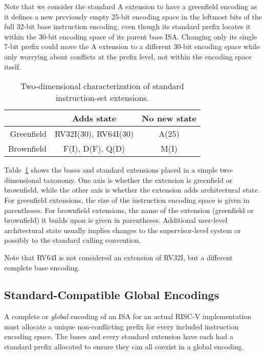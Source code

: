 Note that we consider the standard A extension to have a greenfield
encoding as it defines a new previously empty 25-bit encoding space in
the leftmost bits of the full 32-bit base instruction encoding, even
though its standard prefix locates it within the 30-bit encoding space
of its parent base ISA.
Changing only its single 7-bit prefix could move the
A extension to a different 30-bit encoding space while only worrying
about conflicts at the prefix level, not within the encoding space
itself.

\begin{table}[H]
{
\begin{center}
\begin{tabular}{|r|c|c|}
\hline
 & Adds state & No new state \\ \hline
Greenfield & RV32I(30), RV64I(30) & A(25) \\\hline
Brownfield & F(I), D(F), Q(D) & M(I) \\
\hline
\end{tabular}
\end{center}
}
\caption{Two-dimensional characterization of standard instruction-set
  extensions.}
\label{exttax}
\end{table}

Table~\ref{exttax} shows the bases and standard extensions placed in a
simple two-dimensional taxonomy.  One axis is whether the extension is
greenfield or brownfield, while the other axis is whether the
extension adds architectural state.  For greenfield extensions, the
size of the instruction encoding space is given in parentheses.  For
brownfield extensions, the name of the extension (greenfield or
brownfield) it builds upon is given in parentheses.  Additional
user-level architectural state usually implies changes to the
supervisor-level system or possibly to the standard calling
convention.

Note that RV64I is not considered an extension of RV32I, but a
different complete base encoding.

\vspace{-0.2in}
\subsection*{Standard-Compatible Global Encodings}

A complete or {\em global} encoding of an ISA for an actual RISC-V
implementation must allocate a unique non-conflicting prefix for every
included instruction encoding space.  The bases and every standard
extension have each had a standard prefix allocated to ensure they can
all coexist in a global encoding.

